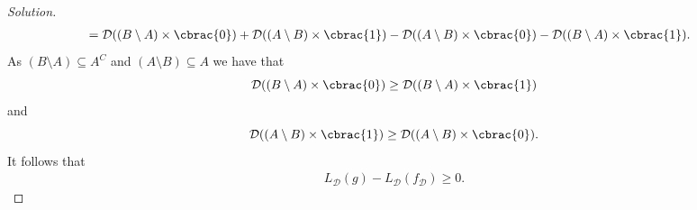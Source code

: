 \documentclass[10pt, a4paper, twoside]{amsart}
\DeclarePairedDelimiter\cbrac\{\}
\newcommand{\se}{\ensuremath{\subseteq}}
\newenvironment{solution}
               {\let\oldqedsymbol=\qedsymbol
                \renewcommand{\qedsymbol}{$\blacktriangleleft$}
                \begin{proof}[Solution]}
               {\end{proof}
                \renewcommand{\qedsymbol}{\oldqedsymbol}}
\begin{document}
\begin{solution}
\begin{align*}
&=  \mathcal{D}((B\setminus A)\times\cbrac{0})+ \mathcal{D}((A\setminus B)\times\cbrac{1})
- \mathcal{D}((A\setminus B)\times\cbrac{0})- \mathcal{D}((B\setminus A)\times\cbrac{1}).
\end{align*}
As $(B\setminus A) \se A^C$ and $(A\setminus B) \se A$ we have that
\begin{equation*}
\mathcal{D}((B\setminus A)\times\cbrac{0}) \geq \mathcal{D}((B\setminus A)\times\cbrac{1})  
\end{equation*}
and 
\begin{equation*}
\mathcal{D}((A\setminus B)\times\cbrac{1}) \geq \mathcal{D}((A\setminus B)\times\cbrac{0}).  
\end{equation*}
It follows that
\begin{align*}
 L_{\mathcal{D}}(g)-L_{\mathcal{D}}(f_{\mathcal{D}}) \geq 0.
\end{align*}
\end{solution}
\end{document}
